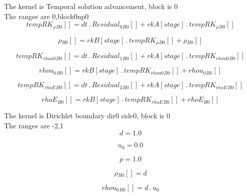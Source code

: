 \documentclass{article}
\begin{document}
\noindent The kernel is Temporal solution advancement, block is 0\\\noindent The ranges are 0,block0np0\\\begin{dmath}{tempRK_{\rho}{_{B0}}}[{}] = dt \,.\, {Residual_{0}{_{B0}}}[{}] + {rkA}[{stage}] \,.\, {tempRK_{\rho}{_{B0}}}[{}]\end{dmath}

\begin{dmath}{\rho{_{B0}}}[{}] = {rkB}[{stage}] \,.\, {tempRK_{\rho}{_{B0}}}[{}] + {\rho{_{B0}}}[{}]\end{dmath}

\begin{dmath}{tempRK_{rhou0}{_{B0}}}[{}] = dt \,.\, {Residual_{1}{_{B0}}}[{}] + {rkA}[{stage}] \,.\, {tempRK_{rhou0}{_{B0}}}[{}]\end{dmath}

\begin{dmath}{rhou_{0}{_{B0}}}[{}] = {rkB}[{stage}] \,.\, {tempRK_{rhou0}{_{B0}}}[{}] + {rhou_{0}{_{B0}}}[{}]\end{dmath}

\begin{dmath}{tempRK_{rhoE}{_{B0}}}[{}] = dt \,.\, {Residual_{2}{_{B0}}}[{}] + {rkA}[{stage}] \,.\, {tempRK_{rhoE}{_{B0}}}[{}]\end{dmath}

\begin{dmath}{rhoE{_{B0}}}[{}] = {rkB}[{stage}] \,.\, {tempRK_{rhoE}{_{B0}}}[{}] + {rhoE{_{B0}}}[{}]\end{dmath}

\noindent The kernel is Dirichlet boundary dir0 side0, block is 0\\\noindent The ranges are -2,1\\\begin{dmath}d = 1.0\end{dmath}

\begin{dmath}u_{0} = 0.0\end{dmath}

\begin{dmath}p = 1.0\end{dmath}

\begin{dmath}{\rho{_{B0}}}[{}] = d\end{dmath}

\begin{dmath}{rhou_{0}{_{B0}}}[{}] = d \,.\, u_{0}\end{dmath}
\end{document}
